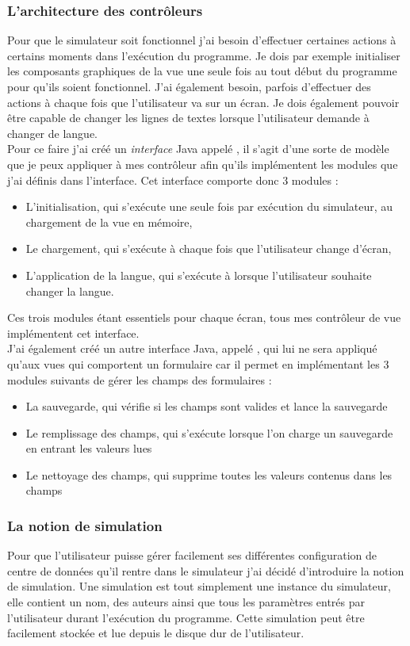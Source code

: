 \subsubsection{L'architecture des contrôleurs}
Pour que le simulateur soit fonctionnel j'ai besoin d'effectuer certaines actions à certains moments dans l'exécution du programme. Je dois par exemple initialiser les composants graphiques de la vue une seule fois au tout début du programme pour qu'ils soient fonctionnel. J'ai également besoin, parfois d'effectuer des actions à chaque fois que l'utilisateur va sur un écran. Je dois également pouvoir être capable de changer les lignes de textes lorsque l'utilisateur demande à changer de langue.\\
Pour ce faire j'ai créé un \emph{interface} Java appelé , il s'agit d'une sorte de modèle que je peux appliquer à mes contrôleur afin qu'ils implémentent les modules que j'ai définis dans l'interface. Cet interface comporte donc 3 modules :
\begin{itemize}
	\item L'initialisation, qui s'exécute une seule fois par exécution du simulateur, au chargement de la vue en mémoire,
	\item Le chargement, qui s'exécute à chaque fois que l'utilisateur change d'écran,
	\item L'application de la langue, qui s'exécute à lorsque l'utilisateur souhaite changer la langue.
\end{itemize}
Ces trois modules étant essentiels pour chaque écran, tous mes contrôleur de vue implémentent cet interface.\\

J'ai également créé un autre interface Java, appelé , qui lui ne sera appliqué qu'aux vues qui comportent un formulaire car il permet en implémentant les 3 modules suivants de gérer les champs des formulaires :
\begin{itemize}
	\item La sauvegarde, qui vérifie si les champs sont valides et lance la sauvegarde
	\item Le remplissage des champs, qui s'exécute lorsque l'on charge un sauvegarde en entrant les valeurs lues
	\item Le nettoyage des champs, qui supprime toutes les valeurs contenus dans les champs
\end{itemize} 

\subsubsection{La notion de simulation}
Pour que l'utilisateur puisse gérer facilement ses différentes configuration de centre de données qu'il rentre dans le simulateur j'ai décidé d'introduire la notion de simulation. Une simulation est tout simplement une instance du simulateur, elle contient un nom, des auteurs ainsi que tous les paramètres entrés par l'utilisateur durant l'exécution du programme. Cette simulation peut être facilement stockée et lue depuis le disque dur de l'utilisateur.\\

